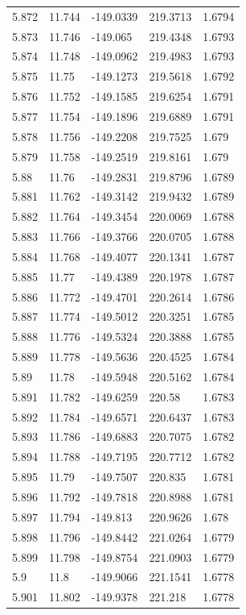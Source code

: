 \begin{tabular}{lllll}
5.872 & 11.744 & -149.0339 & 219.3713 & 1.6794 \\
5.873 & 11.746 & -149.065 & 219.4348 & 1.6793 \\
5.874 & 11.748 & -149.0962 & 219.4983 & 1.6793 \\
5.875 & 11.75 & -149.1273 & 219.5618 & 1.6792 \\
5.876 & 11.752 & -149.1585 & 219.6254 & 1.6791 \\
5.877 & 11.754 & -149.1896 & 219.6889 & 1.6791 \\
5.878 & 11.756 & -149.2208 & 219.7525 & 1.679 \\
5.879 & 11.758 & -149.2519 & 219.8161 & 1.679 \\
5.88 & 11.76 & -149.2831 & 219.8796 & 1.6789 \\
5.881 & 11.762 & -149.3142 & 219.9432 & 1.6789 \\
5.882 & 11.764 & -149.3454 & 220.0069 & 1.6788 \\
5.883 & 11.766 & -149.3766 & 220.0705 & 1.6788 \\
5.884 & 11.768 & -149.4077 & 220.1341 & 1.6787 \\
5.885 & 11.77 & -149.4389 & 220.1978 & 1.6787 \\
5.886 & 11.772 & -149.4701 & 220.2614 & 1.6786 \\
5.887 & 11.774 & -149.5012 & 220.3251 & 1.6785 \\
5.888 & 11.776 & -149.5324 & 220.3888 & 1.6785 \\
5.889 & 11.778 & -149.5636 & 220.4525 & 1.6784 \\
5.89 & 11.78 & -149.5948 & 220.5162 & 1.6784 \\
5.891 & 11.782 & -149.6259 & 220.58 & 1.6783 \\
5.892 & 11.784 & -149.6571 & 220.6437 & 1.6783 \\
5.893 & 11.786 & -149.6883 & 220.7075 & 1.6782 \\
5.894 & 11.788 & -149.7195 & 220.7712 & 1.6782 \\
5.895 & 11.79 & -149.7507 & 220.835 & 1.6781 \\
5.896 & 11.792 & -149.7818 & 220.8988 & 1.6781 \\
5.897 & 11.794 & -149.813 & 220.9626 & 1.678 \\
5.898 & 11.796 & -149.8442 & 221.0264 & 1.6779 \\
5.899 & 11.798 & -149.8754 & 221.0903 & 1.6779 \\
5.9 & 11.8 & -149.9066 & 221.1541 & 1.6778 \\
5.901 & 11.802 & -149.9378 & 221.218 & 1.6778 \\

\end{tabular}
